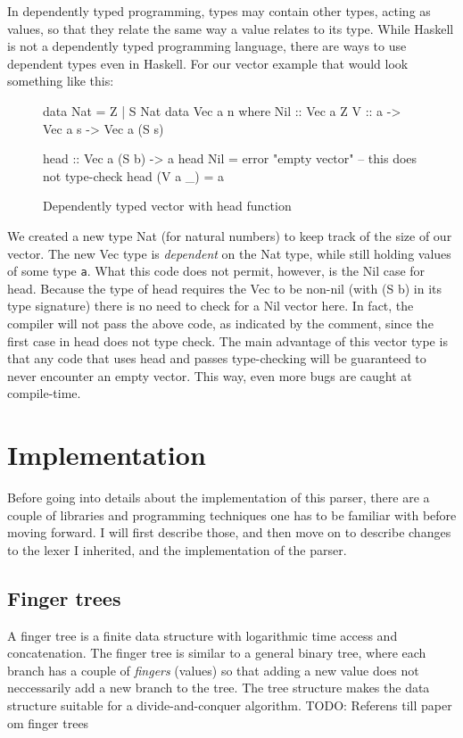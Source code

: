 \documentclass[a4paper,12pt,twosided]{report}
\begin{document}
In dependently typed programming, types may contain other types, acting as
values, so that they relate the same way a value relates to its type. While
Haskell is not a dependently typed programming language, there are ways to use
dependent types even in Haskell. For our vector example that would look
something like this:
\begin{figure}[H]
\begin{code}
data Nat = Z | S Nat
data Vec a n where
    Nil :: Vec a Z
    V :: a -> Vec a s -> Vec a (S s)

head :: Vec a (S b) -> a
head Nil = error "empty vector" -- this does not type-check
head (V a _) = a
\end{code}
\caption{Dependently typed vector with head function}
\end{figure}
We created a new type Nat (for natural numbers) to keep track of the size of our
vector. The new Vec type is \textit{dependent} on the Nat type, while still
holding values of some type \texttt{a}. What this code does not permit, however,
is the Nil case for head. Because the type of head requires the Vec to be
non-nil (with (S b) in its type signature) there is no need to check for a Nil
vector here. In fact, the compiler will not pass the above code, as indicated by
the comment, since the first case in head does not type check. The main
advantage of this vector type is that any code that uses head and passes
type-checking will be guaranteed to never encounter an empty vector.  This way,
even more bugs are caught at compile-time.

%
%

\chapter{Implementation}
Before going into details about the implementation of this parser, there are a
couple of libraries and programming techniques one has to be familiar with
before moving forward. I will first describe those, and then move on to describe
changes to the lexer I inherited, and the implementation of the parser.

\section{Finger trees}
A finger tree is a finite data structure with logarithmic time access and
concatenation. The finger tree is similar to a general binary tree, where each
branch has a couple of \textit{fingers} (values) so that adding a new value does
not neccessarily add a new branch to the tree. The tree structure makes the data
structure suitable for a divide-and-conquer algorithm. TODO: Referens till paper
om finger trees
\end{document}
